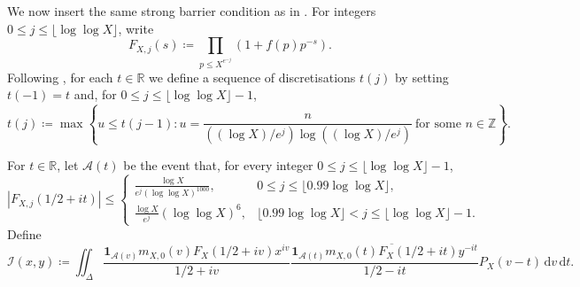 \documentclass[a4paper,12pt,reqno]{amsart}
\numberwithin{equation}{section}
\theoremstyle{remark}
\begin{document}
We now insert the same strong barrier condition as in
\cite[Section~3.3]{Harper2023Large}.  For integers $0\leq j\leq\lfloor\log\log X\rfloor$, write
\[
 F_{X,j}(s)\coloneqq\prod_{p\leq X^{e^{-j}}}(1+f(p)p^{-s}).
\]
Following \cite[Section~2.4]{Harper2023Large}, for each $t\in\mathbb R$
we define a sequence of discretisations $t(j)$ by setting $t(-1)=t$ and,
for $0\leq j\leq\lfloor\log\log X\rfloor-1$,
\[
 t(j)\coloneqq
 \max\left\{
 u\leq t(j-1):
 u=\frac{n}{
 ((\log X)/e^j)\log((\log X)/e^j)}
 \ \text{for some }n\in\mathbb Z
 \right\}.
\]


For $t\in\mathbb R$, let ${\mathcal A}(t)$ be the event that, for every
integer $0\leq j\leq\lfloor\log\log X\rfloor-1$,
\begin{equation}\label{eq:strong-barrier}
 |F_{X,j}(1/2+it)|
 \leq
 \begin{cases}
 \displaystyle
 \frac{\log X}{e^j(\log\log X)^{1000}},
 & 0\leq j\leq\lfloor0.99\log\log X\rfloor,\\[2mm]
 \displaystyle
 \frac{\log X}{e^j}(\log\log X)^6,
 & \lfloor0.99\log\log X\rfloor<j
 \leq\lfloor\log\log X\rfloor-1.
 \end{cases}
\end{equation}
Define
\begin{equation}\label{eq:weighted-main-integral}
 {\mathcal I}(x,y)\coloneqq\iint_\Delta
 \frac{\mathbf 1_{{\mathcal A}(v)}m_{X,0}(v)F_X(1/2+iv)x^{iv}}{1/2+iv}
 \frac{\mathbf 1_{{\mathcal A}(t)}
 \overline{m_{X,0}(t)F_X(1/2+it)}y^{-it}}{1/2-it}
 P_X(v-t)\,\mathrm{d}v\,\mathrm{d}t.
\end{equation}
\end{document}
